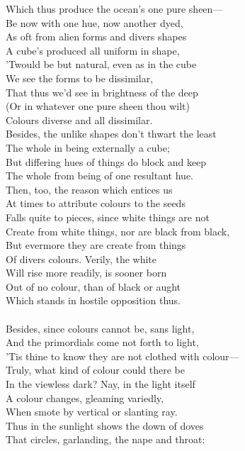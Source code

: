 Which thus produce the ocean's one pure sheen—\\
Be now with one hue, now another dyed,\\
As oft from alien forms and divers shapes\\
A cube's produced all uniform in shape,\\
'Twould be but natural, even as in the cube\\
We see the forms to be dissimilar,\\
That thus we'd see in brightness of the deep\\
(Or in whatever one pure sheen thou wilt)\\
Colours diverse and all dissimilar.\\
Besides, the unlike shapes don't thwart the least\\
The whole in being externally a cube;\\
But differing hues of things do block and keep\\
The whole from being of one resultant hue.\\
Then, too, the reason which entices us\\
At times to attribute colours to the seeds\\
Falls quite to pieces, since white things are not\\
Create from white things, nor are black from black,\\
But evermore they are create from things\\
Of divers colours. Verily, the white\\
Will rise more readily, is sooner born\\
Out of no colour, than of black or aught\\
Which stands in hostile opposition thus.\\
\\
Besides, since colours cannot be, sans light,\\
And the primordials come not forth to light,\\
'Tis thine to know they are not clothed with colour—\\
Truly, what kind of colour could there be\\
In the viewless dark? Nay, in the light itself\\
A colour changes, gleaming variedly,\\
When smote by vertical or slanting ray.\\
Thus in the sunlight shows the down of doves\\
That circles, garlanding, the nape and throat:\\
